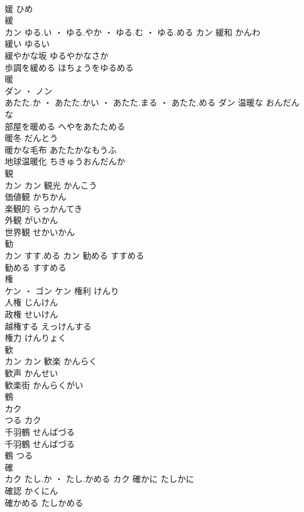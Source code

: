 \documentclass[8pt]{extreport}
\begin{document}
\begin{CJK}{UTF8}{min}
\\	媛	ひめ	
\\	緩	
\\	カン	ゆる.い ・ ゆる.やか ・ ゆる.む ・ ゆる.める	カン	緩和	かんわ	
\\	緩い	ゆるい	
\\	緩やかな坂	ゆるやかなさか	
\\	歩調を緩める	ほちょうをゆるめる	
\\	暖	
\\	ダン ・ ノン
\\	あたた.か ・ あたた.かい ・ あたた.まる ・ あたた.める	ダン	温暖な	おんだんな	
\\	部屋を暖める	へやをあたためる	
\\	暖冬	だんとう	
\\	暖かな毛布	あたたかなもうふ	
\\	地球温暖化	ちきゅうおんだんか	
\\	観	
\\	カン		カン	観光	かんこう	
\\	価値観	かちかん	
\\	楽観的	らっかんてき	
\\	外観	がいかん	
\\	世界観	せかいかん	
\\	勧	
\\	カン	すす.める	カン	勧める	すすめる	
\\	勧める	すすめる	
\\	権	
\\	ケン ・ ゴン		ケン	権利	けんり	
\\	人権	じんけん	
\\	政権	せいけん	
\\	越権する	えっけんする	
\\	権力	けんりょく	
\\	歓	
\\	カン		カン	歓楽	かんらく	
\\	歓声	かんせい	
\\	歓楽街	かんらくがい	
\\	鶴	
\\	カク
\\	つる	カク
\\	千羽鶴	せんばづる	
\\	千羽鶴	せんばづる	
\\	鶴	つる	
\\	確	
\\	カク	たし.か ・ たし.かめる	カク	確かに	たしかに	
\\	確認	かくにん	
\\	確かめる	たしかめる	

\end{CJK}
\end{document}
